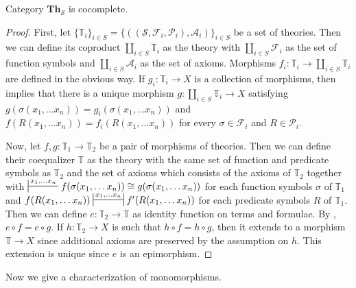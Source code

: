 \documentclass{elsarticle}
\theoremstyle{definition}
\theoremstyle{remark}
\newcommand{\cat}[1]{\mathbf{#1}}
\newcommand{\Th}{\cat{Th}}
\numberwithin{figure}{section}
\begin{document}
\begin{prop}[th-cocomplete]
Category $\Th_\mathcal{S}$ is cocomplete.
\end{prop}
\begin{proof}
First, let $\{ \mathbb{T}_i \}_{i \in S} = \{ ((\mathcal{S},\mathcal{F}_i,\mathcal{P}_i),\mathcal{A}_i) \}_{i \in S}$ be a set of theories.
Then we can define its coproduct $\coprod\limits_{i \in S} \mathbb{T}_i$ as the theory with $\coprod\limits_{i \in S} \mathcal{F}_i$ as the set of function symbols and $\coprod\limits_{i \in S} \mathcal{A}_i$ as the set of axioms.
Morphisms $f_i : \mathbb{T}_i \to \coprod\limits_{i \in S} \mathbb{T}_i$ are defined in the obvious way.
If $g_i : \mathbb{T}_i \to X$ is a collection of morphisms, then  implies that there is a unique morphism $g : \coprod\limits_{i \in S} \mathbb{T}_i \to X$
    satisfying $g(\sigma(x_1, \ldots x_n)) = g_i(\sigma(x_1, \ldots x_n))$ and $f(R(x_1, \ldots x_n)) = f_i(R(x_1, \ldots x_n))$
    for every $\sigma \in \mathcal{F}_i$ and $R \in \mathcal{P}_i$.

Now, let $f,g : \mathbb{T}_1 \to \mathbb{T}_2$ be a pair of morphisms of theories.
Then we can define their coequalizer $\mathbb{T}$ as the theory with the same set of function and predicate symbols as $\mathbb{T}_2$ and the set of axioms which consists of the axioms of $\mathbb{T}_2$
together with $\sststile{}{x_1, \ldots x_n} f(\sigma(x_1, \ldots x_n)) \cong g(\sigma(x_1, \ldots x_n))$ for each function symbols $\sigma$ of $\mathbb{T}_1$
and $f(R(x_1, \ldots x_n)) \ssststile{}{x_1, \ldots x_n} f'(R(x_1, \ldots x_n))$ for each predicate symbols $R$ of $\mathbb{T}_1$.
Then we can define $e : \mathbb{T}_2 \to \mathbb{T}$ as identity function on terms and formulae.
By , $e \circ f = e \circ g$.
If $h : \mathbb{T}_2 \to X$ is such that $h \circ f = h \circ g$, then it extends to a morphism $\mathbb{T} \to X$ since additional axioms are preserved by the assumption on $h$.
This extension is unique since $e$ is an epimorphism.
\end{proof}

Now we give a characterization of monomorphisms.
\end{document}
